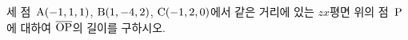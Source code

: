 세 점~$\mathrm{A}(-1{,}\mkern3mu\mathopen{}1{,}\mkern3mu\mathopen{}1)$, $\mathrm{B}(1{,}\mkern3mu\mathopen{}-4{,}\mkern3mu\mathopen{}2)$, $\mathrm{C}(-1{,}\mkern3mu\mathopen{}2{,}\mkern3mu\mathopen{}0)$에서 같은 거리에 있는 $zx$평면 위의 점~$\mathrm{P}$에 대하여 $\overline{\mathrm{OP}}$의 길이를 구하시오.
